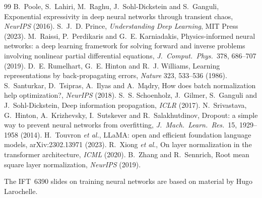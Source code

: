 \documentclass[11pt]{article}
\begin{document}
\begin{thebibliography}{99}
 B.~Poole, S.~Lahiri, M.~Raghu, J.~Sohl-Dickstein and S.~Ganguli, Exponential expressivity in deep neural networks through transient chaos, \emph{NeurIPS} (2016).
 S.~J.~D. Prince, \emph{Understanding Deep Learning}, MIT Press (2023).
 M.~Raissi, P.~Perdikaris and G.~E. Karniadakis, Physics-informed neural networks: a deep learning framework for solving forward and inverse problems involving nonlinear partial differential equations, \emph{J.\ Comput.\ Phys.}\ 378, 686--707 (2019).
 D.~E. Rumelhart, G.~E. Hinton and R.~J. Williams, Learning representations by back-propagating errors, \emph{Nature} 323, 533--536 (1986).
 S.~Santurkar, D.~Tsipras, A.~Ilyas and A.~M\k{a}dry, How does batch normalization help optimization?, \emph{NeurIPS} (2018).
 S.~S. Schoenholz, J.~Gilmer, S.~Ganguli and J.~Sohl-Dickstein, Deep information propagation, \emph{ICLR} (2017).
 N.~Srivastava, G.~Hinton, A.~Krizhevsky, I.~Sutskever and R.~Salakhutdinov, Dropout: a simple way to prevent neural networks from overfitting, \emph{J.\ Mach.\ Learn.\ Res.}\ 15, 1929--1958 (2014).
 H.~Touvron \emph{et al.}, LLaMA: open and efficient foundation language models, arXiv:2302.13971 (2023).
 R.~Xiong \emph{et al.}, On layer normalization in the transformer architecture, \emph{ICML} (2020).
 B.~Zhang and R.~Sennrich, Root mean square layer normalization, \emph{NeurIPS} (2019).
\end{thebibliography}

\SourceNote
{\footnotesize\color{mute}The IFT~6390 slides on training neural networks are based on material by Hugo Larochelle.\par}
\end{document}
